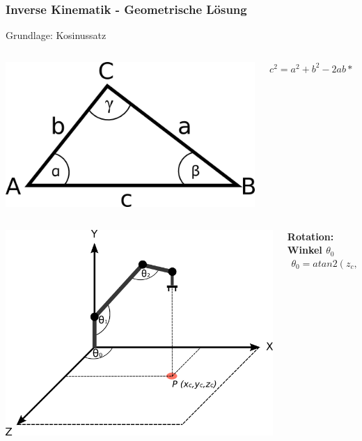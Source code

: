 \begin{frame}
\frametitle{Inverse Kinematik - Geometrische Lösung}
\begin{block}{Grundlage: Kosinussatz}
\begin{columns}
\begin{column}{.3\textwidth}
\includegraphics[scale=0.25]{imgs/cos.png}
\end{column}%
\begin{column}{.5\textwidth}
$c^2 = a^2 + b^2 - 2ab * \cos	\gamma$
\end{column}
\end{columns}
\end{block}

\begin{columns}
\begin{column}{.48\textwidth}
\includegraphics[scale=0.248]{imgs/3d_robo.png}
\end{column}%
\hfill%
\begin{column}{.48\textwidth}
\textbf{Rotation: Winkel $\theta_0$}
\begin{eqnarray*}
	\theta_0 = atan2(z_c, x_c) \left[+ \pi \right]
	\end{eqnarray*}
\end{column}
\end{columns}

\end{frame}

